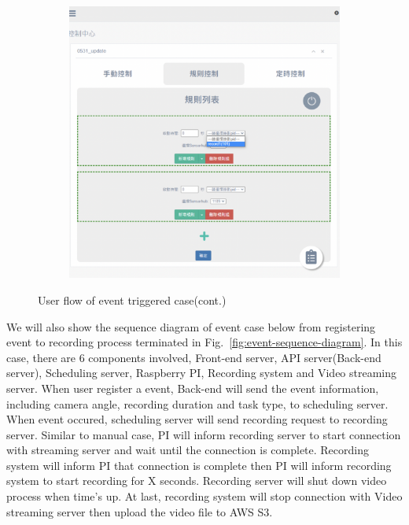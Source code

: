 \begin{figure}[H]
    \ContinuedFloat
    \centering
    \begin{subfigure}{\textwidth}
        \includegraphics[width=\textwidth]{figsrc/event-userflow-c.png}
        \label{fig:event-userflow-c}
    \end{subfigure}

    \caption{User flow of event triggered case(cont.)}
    \label{fig:event-userflow}
\end{figure}

We will also show the sequence diagram of event case below from registering event to recording process terminated in Fig.~\ref{fig:event-sequence-diagram}. In this case, there are 6 components involved, Front-end server, API server(Back-end server), Scheduling server, Raspberry PI, Recording system and Video streaming server. When user register a event, Back-end will send the event information, including camera angle, recording duration and task type, to scheduling server. When event occured, scheduling server will send recording request to recording server. Similar to manual case, PI will inform recording server to start connection with streaming server and wait until the connection is complete. Recording system will inform PI that connection is complete then PI will inform recording system to start recording for X seconds. Recording server will shut down video process when time's up. At last, recording system will stop connection with Video streaming server then upload the video file to AWS S3.

